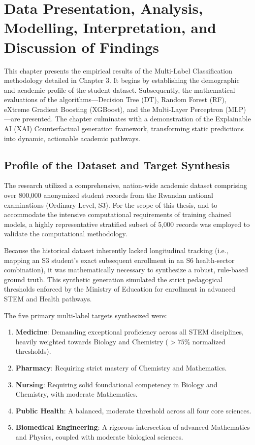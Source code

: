 \section{Data Presentation, Analysis, Modelling, Interpretation, and Discussion of Findings} 

This chapter presents the empirical results of the Multi-Label \parencite{tsoumakas2007multi} Classification methodology detailed in Chapter 3. It begins by establishing the demographic and academic profile of the student dataset. Subsequently, the mathematical evaluations of the algorithms---Decision Tree (DT), Random Forest \parencite{breiman2001random} (RF), eXtreme Gradient Boosting (XGBoost), and the Multi-Layer Perceptron \parencite{zhang2013review} (MLP)---are presented. The chapter culminates with a demonstration of the Explainable AI (XAI) Counterfactual \parencite{wachter2017counterfactual} generation framework, transforming static predictions into dynamic, actionable academic pathways.

\subsection{Profile of the Dataset and Target Synthesis}

The research utilized a comprehensive, nation-wide academic dataset comprising over 800,000 anonymized student records from the Rwandan national examinations (Ordinary Level, S3). For the scope of this thesis, and to accommodate the intensive computational requirements of training chained models, a highly representative stratified subset of 5,000 records was employed to validate the computational methodology.

Because the historical dataset inherently lacked longitudinal tracking (i.e., mapping an S3 student's exact subsequent enrollment in an S6 health-sector combination), it was mathematically necessary to synthesize a robust, rule-based ground truth. This synthetic generation simulated the strict pedagogical thresholds enforced by the Ministry of Education for enrollment in advanced STEM and Health pathways.

The five primary multi-label \parencite{tsoumakas2007multi} targets synthesized were:
\begin{enumerate}
    \item \textbf{Medicine}: Demanding exceptional proficiency across all STEM disciplines, heavily weighted towards Biology and Chemistry ($>75\%$ normalized thresholds).
    \item \textbf{Pharmacy}: Requiring strict mastery of Chemistry and Mathematics.
    \item \textbf{Nursing}: Requiring solid foundational competency in Biology and Chemistry, with moderate Mathematics.
    \item \textbf{Public Health}: A balanced, moderate threshold across all four core sciences.
    \item \textbf{Biomedical Engineering}: A rigorous intersection of advanced Mathematics and Physics, coupled with moderate biological sciences.
\end{enumerate}

